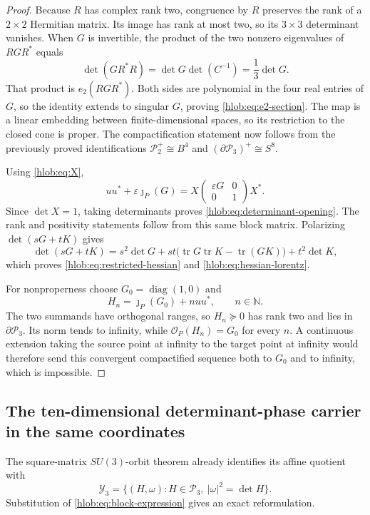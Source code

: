 \begin{proof}
Because \(R\) has complex rank two, congruence by \(R\) preserves the rank
of a \(2\times2\) Hermitian matrix.  Its image has rank at most two, so its
\(3\times3\) determinant vanishes.  When \(G\) is invertible, the product of
the two nonzero eigenvalues of \(RGR^*\) equals
\[
 \det(GR^*R)=\det G\det(C^{-1})=\frac13\det G.
\]
That product is \(e_2(RGR^*)\).  Both sides are polynomial in the four real
entries of \(G\), so the identity extends to singular \(G\), proving
\eqref{hlob:eq:e2-section}.  The map is a linear embedding between
finite-dimensional spaces, so its restriction to the closed cone is proper.
The compactification statement now follows from the previously proved
identifications
\(\mathcal P_2^+\cong B^4\) and
\((\partial\mathcal P_3)^+\cong S^8\).

Using \eqref{hlob:eq:X},
\[
 uu^*+\varepsilon\jmath_P(G)
 =X\begin{pmatrix}\varepsilon G&0\\0&1\end{pmatrix}X^*.
\]
Since \(\det X=1\), taking determinants proves
\eqref{hlob:eq:determinant-opening}.  The rank and positivity statements
follow from this same block matrix.  Polarizing
\(\det(sG+tK)\) gives
\[
 \det(sG+tK)
 =s^2\det G
  +st\bigl(\operatorname{tr}G\operatorname{tr}K
           -\operatorname{tr}(GK)\bigr)
  +t^2\det K,
\]
which proves \eqref{hlob:eq:restricted-hessian} and
\eqref{hlob:eq:hessian-lorentz}.

For nonproperness choose \(G_0=\operatorname{diag}(1,0)\) and
\[
 H_n=\jmath_P(G_0)+n uu^*,\qquad n\in\mathbb N.
\]
The two summands have orthogonal ranges, so \(H_n\succeq0\) has rank two
and lies in \(\partial\mathcal P_3\).  Its norm tends to infinity, while
\(\mathcal O_P(H_n)=G_0\) for every \(n\).  A continuous extension taking
the source point at infinity to the target point at infinity would therefore
send this convergent compactified sequence both to \(G_0\) and to infinity,
which is impossible.
\end{proof}

\subsection{The ten-dimensional determinant-phase carrier in the same coordinates}
\label{hlob:subsec:ten-dimensional}

The square-matrix \(SU(3)\)-orbit theorem already identifies its affine
quotient with
\begin{equation}
 \mathcal Y_3
 =\{(H,\omega):H\in\mathcal P_3,\ |\omega|^2=\det H\}.
 \label{hlob:eq:Y3}
\end{equation}
Substitution of \eqref{hlob:eq:block-expression} gives an exact
reformulation.

